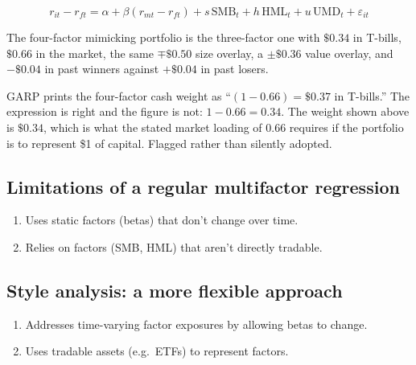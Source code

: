 \gapbadge
{}

\begin{imfmlbox}
\[ r_{it} - r_{ft} = \alpha + \beta(r_{mt}-r_{ft}) + s\,\text{SMB}_t
   + h\,\text{HML}_t + u\,\text{UMD}_t + \varepsilon_{it} \]
\end{imfmlbox}

The four-factor mimicking portfolio is the three-factor one with $\$0.34$ in
T-bills, $\$0.66$ in the market, the same $\mp\$0.50$ size overlay, a
$\pm\$0.36$ value overlay, and $-\$0.04$ in past winners against $+\$0.04$ in
past losers.

\begin{imtrapbox}[breakable=false,title={An arithmetic slip in the source book}]
GARP prints the four-factor cash weight as ``$(1 - 0.66) = \$0.37$ in T-bills.''
The expression is right and the figure is not: $1 - 0.66 = 0.34$. The weight
shown above is $\$0.34$, which is what the stated market loading of $0.66$
requires if the portfolio is to represent \$1 of capital. Flagged rather than
silently adopted.
\end{imtrapbox}


\subsection{Limitations of a regular multifactor regression}

\begin{enumerate}[label=\alph*)]
\item Uses static factors (betas) that don't change over time.
\item Relies on factors (SMB, HML) that aren't directly tradable.
\end{enumerate}

\subsection{Style analysis: a more flexible approach}

\begin{enumerate}[label=\alph*)]
\item Addresses time-varying factor exposures by allowing betas to change.
\item Uses tradable assets (e.g.\ ETFs) to represent factors.
\end{enumerate}

